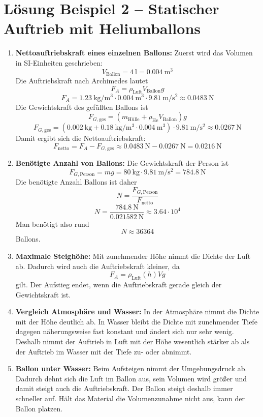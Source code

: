 \documentclass[11pt, a4paper]{article}
\begin{document}
\section*{Lösung Beispiel 2 -- Statischer Auftrieb mit Heliumballons}
\begin{enumerate}
    \item \textbf{Nettoauftriebskraft eines einzelnen Ballons:}
    Zuerst wird das Volumen in SI-Einheiten geschrieben:
    \[
        V_{\text{Ballon}} = \SI{4}{\litre} = \SI{0.004}{\metre\cubed}
    \]
    Die Auftriebskraft nach Archimedes lautet
    \[
        F_A = \rho_{\text{Luft}} V_{\text{Ballon}} g
    \]
    \[
        F_A = \SI{1.23}{\kilogram\per\metre\cubed} \cdot \SI{0.004}{\metre\cubed} \cdot \SI{9.81}{\metre\per\second\squared} \approx \SI{0.0483}{\newton}
    \]
    Die Gewichtskraft des gefüllten Ballons ist
    \[
        F_{G,\text{ges}} = (m_{\text{Hülle}} + \rho_{\text{He}} V_{\text{Ballon}}) g
    \]
    \[
        F_{G,\text{ges}} = (\SI{0.002}{\kilogram} + \SI{0.18}{\kilogram\per\metre\cubed} \cdot \SI{0.004}{\metre\cubed}) \cdot \SI{9.81}{\metre\per\second\squared} \approx \SI{0.0267}{\newton}
    \]
    Damit ergibt sich die Nettoauftriebskraft:
    \[
        F_{\text{netto}} = F_A - F_{G,\text{ges}} \approx \SI{0.0483}{\newton} - \SI{0.0267}{\newton} = \SI{0.0216}{\newton}
    \]

    \item \textbf{Benötigte Anzahl von Ballons:}
    Die Gewichtskraft der Person ist
    \[
        F_{G,\text{Person}} = mg = \SI{80}{\kilogram} \cdot \SI{9.81}{\metre\per\second\squared} = \SI{784.8}{\newton}
    \]
    Die benötigte Anzahl Ballons ist daher
    \[
        N = \frac{F_{G,\text{Person}}}{F_{\text{netto}}}
    \]
    \[
        N = \frac{\SI{784.8}{\newton}}{\SI{0.021582}{\newton}} \approx 3.64 \cdot 10^4
    \]
    Man benötigt also rund
    \[
        N \approx 36364
    \]
    Ballons.

    \item \textbf{Maximale Steighöhe:}
    Mit zunehmender Höhe nimmt die Dichte der Luft ab. Dadurch wird auch die Auftriebskraft kleiner, da
    \[
        F_A = \rho_{\text{Luft}}(h) V g
    \]
    gilt. Der Aufstieg endet, wenn die Auftriebskraft gerade gleich der Gewichtskraft ist.

    \item \textbf{Vergleich Atmosphäre und Wasser:}
    In der Atmosphäre nimmt die Dichte mit der Höhe deutlich ab. In Wasser bleibt die Dichte mit zunehmender Tiefe dagegen näherungsweise fast konstant und ändert sich nur sehr wenig. Deshalb nimmt der Auftrieb in Luft mit der Höhe wesentlich stärker ab als der Auftrieb im Wasser mit der Tiefe zu- oder abnimmt.

    \item \textbf{Ballon unter Wasser:}
    Beim Aufsteigen nimmt der Umgebungsdruck ab. Dadurch dehnt sich die Luft im Ballon aus, sein Volumen wird größer und damit steigt auch die Auftriebskraft. Der Ballon steigt deshalb immer schneller auf. Hält das Material die Volumenzunahme nicht aus, kann der Ballon platzen.
\end{enumerate}
\end{document}
